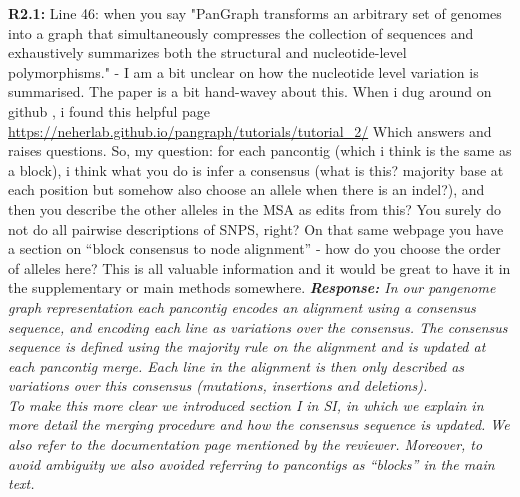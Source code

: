 \documentclass[aps,rmp,onecolumn]{revtex4-1}
\newcommand{\Marco}[1]{{\color{gray}Marco: #1}}
\newcommand{\Liam}[1]{{\color{teal}Liam: #1}}
\newcommand{\reviewer}[2]{\textbf{#1:} #2\vskip 5mm}
\newcommand{\response}[1]{{\it {\color{response}\textbf{Response:} #1}}\vskip 5mm}
\begin{document}
\reviewer{R2.1}{Line 46: when you say "PanGraph transforms an arbitrary set of genomes into a graph that simultaneously compresses the collection of sequences and exhaustively summarizes both the structural and nucleotide-level polymorphisms." - I am a bit unclear on how the nucleotide level variation is summarised. The paper is a bit hand-wavey about this. When i dug around on github , i found this helpful page \url{https://neherlab.github.io/pangraph/tutorials/tutorial_2/} Which answers and raises questions. So, my question: for each pancontig (which i think is the same as a block), i think what you do is infer a consensus (what is this? majority base at each position but somehow also choose an allele when there is an indel?), and then you describe the other alleles in the MSA as edits from this? You surely do not do all pairwise descriptions of SNPS, right? On that same webpage you have a section on ``block consensus to node alignment'' - how do you choose the order of alleles here? This is all valuable information and it would be great to have it in the supplementary or main methods somewhere.}
\response{In our pangenome graph representation each pancontig encodes an alignment using a consensus sequence, and encoding each line as variations over the consensus. The consensus sequence is defined using the majority rule on the alignment and is updated at each pancontig merge. Each line in the alignment is then only described as variations over this consensus (mutations, insertions and deletions).\\
      To make this more clear we introduced section I in SI, in which we explain in more detail the merging procedure and how the consensus sequence is updated. We also refer to the documentation page mentioned by the reviewer. Moreover, to avoid ambiguity we also avoided referring to pancontigs as ``blocks'' in the main text.}
\end{document}
